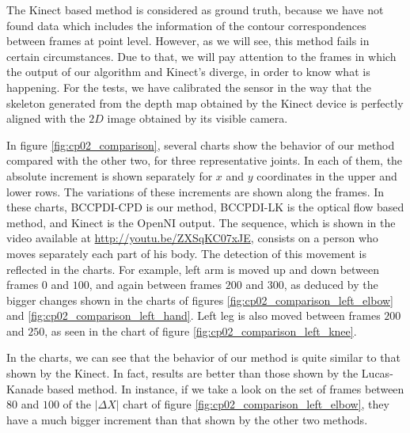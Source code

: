 The Kinect based method is considered as ground truth, because we have not found data which includes the information of 
the contour correspondences between frames at point level. However, as we will see, this method fails in certain circumstances. Due to that, we will pay attention to the frames in which the output of 
our algorithm and Kinect's diverge, in order to know what is happening. For the tests, we have calibrated the sensor in 
the way that the skeleton generated from the depth map obtained by the Kinect device is perfectly aligned with the $2D$ 
image obtained by its visible camera.

In figure \ref{fig:cp02_comparison}, several charts show the behavior of our method compared with the other two, for three 
representative joints. In each of them, the absolute increment is shown separately for $x$ and $y$ coordinates in the 
upper and lower rows. The variations of these increments are shown along the frames. In these charts, BCCPDI-CPD is 
our method, BCCPDI-LK is the optical flow based method, and Kinect is the OpenNI output. The sequence, which is shown in 
the video available at \url{http://youtu.be/ZXSqKC07xJE}, consists on a person who moves separately each part of 
his body. The detection of this movement is reflected in the charts. For example, left arm is moved up and down between 
frames $0$ and $100$, and again between frames $200$ and $300$, as deduced by the bigger changes shown in the charts of 
figures \ref{fig:cp02_comparison_left_elbow} and \ref{fig:cp02_comparison_left_hand}. Left leg is also moved between frames $200$ 
and $250$, as seen in the chart of figure \ref{fig:cp02_comparison_left_knee}.

In the charts, we can see that the behavior of our method is quite similar to that shown by the Kinect. In fact, results are better than those shown by the Lucas-Kanade based method. In instance, if we take a look on the set of 
frames between $80$ and $100$ of the $|\Delta X|$ chart of figure \ref{fig:cp02_comparison_left_elbow}, they have a much 
bigger increment than that shown by the other two methods. 

